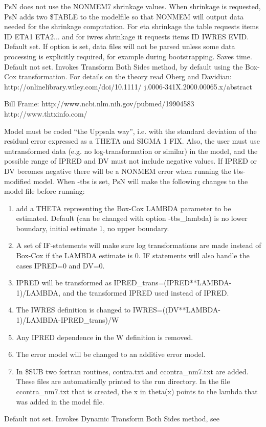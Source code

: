 \begin{optionlist}
PsN does not use the NONMEM7 shrinkage values. When shrinkage is requested, PsN adds two \$TABLE to the modelfile so that NONMEM will output data needed for the shrinkage computation. For eta shrinkage the table requests items ID ETA1 ETA2... and for iwres shrinkage it requests items ID IWRES EVID. 
\nextopt
{}
Default set. If option is set, data files will not be parsed unless some data processing is explicitly required, for example during bootstrapping. Saves time. 
\nextopt
{}
Default not set. Invokes Transform Both Sides method, by default using the Box-Cox transformation. For details on the theory read Oberg and Davidian: http://onlinelibrary.wiley.com/doi/10.1111/ j.0006-341X.2000.00065.x/abstract

Bill Frame: http://www.ncbi.nlm.nih.gov/pubmed/19904583
 http://www.thtxinfo.com/
 
 Model must be coded “the Uppsala way”, i.e. with the standard deviation of the residual error expressed as a THETA and SIGMA 1 FIX. 
Also, the user must use untransformed data (e.g. no log-transformation or similar) in the model, and the possible range of IPRED and DV must not include negative values. If IPRED or DV becomes negative there will be a NONMEM error when running the tbs-modified model. 
 When -tbs is set, PsN will make the following changes to the model file before running:
\begin{enumerate}
	\item add a THETA representing the Box-Cox LAMBDA parameter to be estimated. Default (can be changed with option -tbs\_lambda) is no lower boundary, initial estimate 1, no upper boundary.
	\item A set of IF-statements will make sure log transformations are made instead of Box-Cox if the LAMBDA estimate is 0. IF statements will also handle the cases IPRED=0 and DV=0.
	\item IPRED will be transformed as 
 IPRED\_trans=(IPRED**LAMBDA-1)/LAMBDA, 
 and the transformed  IPRED used instead of IPRED.  
	\item The IWRES definition is changed to 
 IWRES=((DV**LAMBDA-1)/LAMBDA-IPRED\_trans)/W
	\item Any IPRED dependence in the W definition is removed.
	\item The error model will be changed to an additive error model.
	\item In \$SUB two fortran routines, contra.txt and ccontra\_nm7.txt are added. These files are automatically printed to the run directory. In the file ccontra\_nm7.txt that is created, the x in theta(x) points to the lambda that was added in the model file.
\end{enumerate}
\nextopt
{}
Default not set. Invokes Dynamic Transform Both Sides method, see 
 

\end{optionlist}
